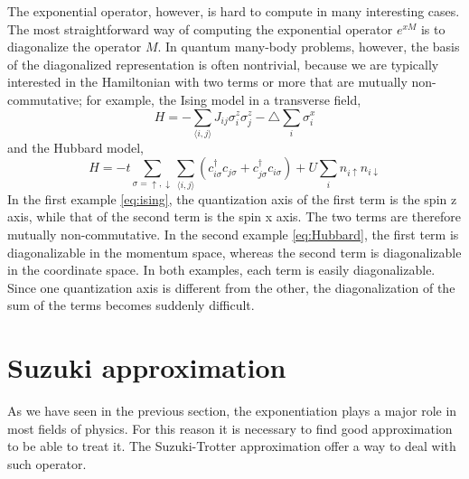 The exponential operator, however, is hard to compute in many interesting cases. The most straightforward way of computing the exponential operator $e^{xM}$ is to diagonalize the operator $M$. In quantum many-body problems, however, the basis of the diagonalized representation is often nontrivial, because we are typically interested in the Hamiltonian with two terms or more that are mutually non-commutative; for example, the Ising model in a transverse field,
\begin{equation} \label{eq:ising}
H = -\sum_{\langle i,j \rangle} J_{ij} \sigma_i^z \sigma_j^z - \triangle\sum_i \sigma_i^x
\end{equation}
and the Hubbard model,
\begin{equation} \label{eq:Hubbard}
H = -t \sum_{\sigma = \uparrow ,\downarrow} \sum_{\langle i,j \rangle} (c_{i\sigma}^\dagger c_{j\sigma} + c_{j\sigma}^\dagger c_{i\sigma}) + U\sum_i n_{i\uparrow} n_{i\downarrow}
\end{equation}
In the first example \eqref{eq:ising}, the quantization axis of the first term is the spin z axis, while that of the second term is the spin x axis. The two terms are therefore mutually non-commutative. In the second example \eqref{eq:Hubbard}, the first term is diagonalizable in the momentum space, whereas the second term is diagonalizable in the coordinate space. In both examples, each term is easily diagonalizable. Since one quantization axis is different from the other, the diagonalization of the sum of the terms becomes suddenly difficult.

\section{Suzuki approximation}

As we have seen in the previous section, the exponentiation plays a major role in most fields of physics. For this reason it is necessary to find good approximation to be able to treat it. The Suzuki-Trotter approximation offer a way to deal with such operator. 

